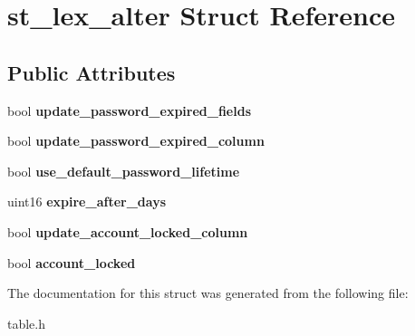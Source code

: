 \hypertarget{structst__lex__alter}{}\section{st\+\_\+lex\+\_\+alter Struct Reference}
\label{structst__lex__alter}
\subsection*{Public Attributes}
\begin{DoxyCompactItemize}
\item 
\mbox{\label{structst__lex__alter_aebfb98e77f5cd9c1cc1e87ed787e969c}} 
bool {\bfseries update\+\_\+password\+\_\+expired\+\_\+fields}
\item 
\mbox{\label{structst__lex__alter_a4e69d8eaf795060b7db1424e04f91c5f}} 
bool {\bfseries update\+\_\+password\+\_\+expired\+\_\+column}
\item 
\mbox{\label{structst__lex__alter_adaaf5f457d6628fd353f124c097f1854}} 
bool {\bfseries use\+\_\+default\+\_\+password\+\_\+lifetime}
\item 
\mbox{\label{structst__lex__alter_ab57cd81bf75daf24e4b0c8176f98d882}} 
uint16 {\bfseries expire\+\_\+after\+\_\+days}
\item 
\mbox{\label{structst__lex__alter_ab4f39c8260826f70b75aac02844bfa98}} 
bool {\bfseries update\+\_\+account\+\_\+locked\+\_\+column}
\item 
\mbox{\label{structst__lex__alter_acc8a3386b02876829d3fe2d526d31f46}} 
bool {\bfseries account\+\_\+locked}
\end{DoxyCompactItemize}


The documentation for this struct was generated from the following file\+:\begin{DoxyCompactItemize}
\item 
table.\+h\end{DoxyCompactItemize}
